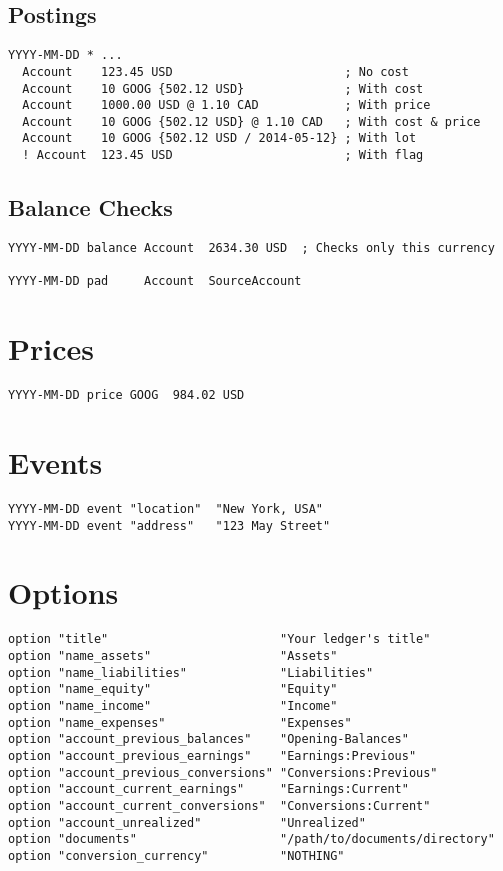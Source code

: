 \documentclass[10pt,landscape]{article}
\begin{document}
\begin{multicols}{2}
\subsection{Postings}
\begin{verbatim}
YYYY-MM-DD * ...
  Account    123.45 USD                        ; No cost
  Account    10 GOOG {502.12 USD}              ; With cost
  Account    1000.00 USD @ 1.10 CAD            ; With price
  Account    10 GOOG {502.12 USD} @ 1.10 CAD   ; With cost & price
  Account    10 GOOG {502.12 USD / 2014-05-12} ; With lot
  ! Account  123.45 USD                        ; With flag
\end{verbatim}

\subsection{Balance Checks}
\begin{verbatim}
YYYY-MM-DD balance Account  2634.30 USD  ; Checks only this currency

YYYY-MM-DD pad     Account  SourceAccount
\end{verbatim}



\columnbreak

\section{Prices}
\begin{verbatim}
YYYY-MM-DD price GOOG  984.02 USD
\end{verbatim}



\section{Events}
\begin{verbatim}
YYYY-MM-DD event "location"  "New York, USA"
YYYY-MM-DD event "address"   "123 May Street"
\end{verbatim}



\section{Options}
\begin{verbatim}
option "title"                        "Your ledger's title"
option "name_assets"                  "Assets"
option "name_liabilities"             "Liabilities"
option "name_equity"                  "Equity"
option "name_income"                  "Income"
option "name_expenses"                "Expenses"
option "account_previous_balances"    "Opening-Balances"
option "account_previous_earnings"    "Earnings:Previous"
option "account_previous_conversions" "Conversions:Previous"
option "account_current_earnings"     "Earnings:Current"
option "account_current_conversions"  "Conversions:Current"
option "account_unrealized"           "Unrealized"
option "documents"                    "/path/to/documents/directory"
option "conversion_currency"          "NOTHING"


\end{verbatim}
\end{multicols}
\end{document}
